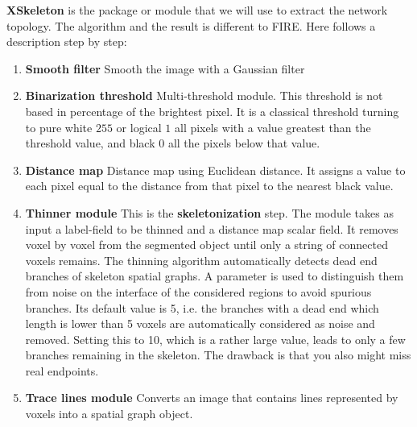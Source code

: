 \textbf{XSkeleton} is the package or module that we will use to extract the
network topology. The algorithm and the result is different to FIRE. Here
follows a description step by step:
\begin{enumerate}[label=\textbf{\Alph*}]
 \item\textbf{Smooth filter} Smooth the image with a Gaussian filter
 \item\textbf{Binarization threshold} Multi-threshold module. This threshold is
 not based in percentage of the brightest pixel. It is a classical threshold turning
 to pure white $255$ or logical $1$ all pixels with a value greatest than the
 threshold value, and black $0$ all the pixels below that value.
 \item\textbf{Distance map} Distance map using Euclidean distance. It assigns a
 value to each pixel equal to the distance from that pixel to the nearest black value. 
 \item\textbf{Thinner module} This is the \textbf{skeletonization} step. The
 module takes as input a label-field to be thinned and a distance map scalar field. It removes voxel by voxel from the segmented
 object until only a string of connected voxels remains.
 The thinning algorithm automatically detects dead end branches of skeleton
 spatial graphs. A parameter is used to distinguish them from noise on the
 interface  of the considered regions to avoid spurious branches.  Its default
 value is 5, i.e. the branches with a dead end which length is lower  than 5
 voxels are automatically considered as noise and removed.  Setting this to 10,
 which is a rather large value, leads to only a few branches remaining in the
 skeleton.  The drawback is that you also might miss real endpoints.
 
\item\textbf{Trace lines module} Converts an image that contains lines
represented by voxels into a spatial graph object.

 \end{enumerate}

